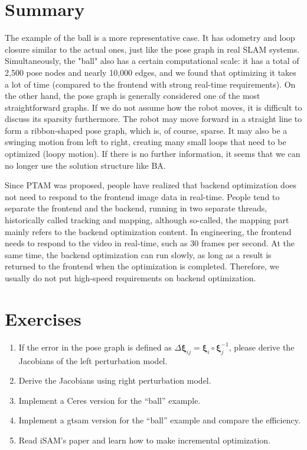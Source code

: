 \section{Summary}
The example of the ball is a more representative case. It has odometry and loop closure similar to the actual ones, just like the pose graph in real SLAM systems. Simultaneously, the "ball" also has a certain computational scale: it has a total of 2,500 pose nodes and nearly 10,000 edges, and we found that optimizing it takes a lot of time (compared to the frontend with strong real-time requirements). On the other hand, the pose graph is generally considered one of the most straightforward graphs. If we do not assume how the robot moves, it is difficult to discuss its sparsity furthermore. The robot may move forward in a straight line to form a ribbon-shaped pose graph, which is, of course, sparse. It may also be a swinging motion from left to right, creating many small loops that need to be optimized (loopy motion). If there is no further information, it seems that we can no longer use the solution structure like BA.

Since PTAM\textsuperscript{\cite{Klein2007}} was proposed, people have realized that backend optimization does not need to respond to the frontend image data in real-time. People tend to separate the frontend and the backend, running in two separate threads, historically called tracking and mapping, although so-called, the mapping part mainly refers to the backend optimization content. In engineering, the frontend needs to respond to the video in real-time, such as 30 frames per second. At the same time, the backend optimization can run slowly, as long as a result is returned to the frontend when the optimization is completed. Therefore, we usually do not put high-speed requirements on backend optimization.

\section*{Exercises}
\begin{enumerate}
	\item If the error in the pose graph is defined as $\Delta \bm{\xi}_{ij} = \bm{\xi}_i \circ \bm{\xi}_j^{-1}$, please derive the Jacobians of the left perturbation model.
	\item Derive the Jacobians using right perturbation model. 
	\item Implement a Ceres version for the ``ball'' example. 
	\item Implement a gtsam version for the ``ball'' example and compare the efficiency. 
	\item[\optional] Read iSAM's paper \cite{Kaess2008,Kaess2011} and learn how to make incremental optimization. 
\end{enumerate}

